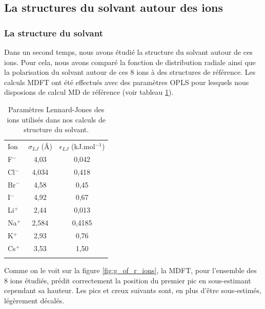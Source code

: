 \subsection{La structures du solvant autour des ions}

\subsubsection{La structure du solvant}
Dans un second temps, nous avons étudié la structure du solvant autour de ces ions. Pour cela, nous avons comparé la fonction de distribution radiale ainsi que la polarisation du solvant autour de ces 8 ions à des structures de référence.
Les calculs MDFT ont été effectués avec des paramètres OPLS\cite{jorgensen_development_1996} pour lesquels nous disposions de calcul MD de référence\cite{zhao_molecular_2011} (voir tableau \ref{tab:param_lj_ions_daniel}).

\begin{table}[ht]
  \centering
  \begin{tabular}{l c c}
   \hline & \\[-1em]\hline
    Ion    & $\sigma_{LJ}$ (\AA) & $\epsilon_{LJ}$ (kJ.mol$^{-1}$) \\
    \hline
      F$^-$	 & 4,03 & 0,042 \\
      Cl$^-$ & 4,034 & 0,418 \\
      Br$^-$ & 4,58 & 0,45 \\
      I$^-$  & 4,92 & 0,67 \\
      Li$^+$ & 2,44 & 0,013 \\
      Na$^+$ & 2,584 & 0,4185 \\
      K$^+$  & 2,93 & 0,76 \\
      Cs$^+$ & 3,53 & 1,50 \\
    \hline & \\[-1em]\hline
  \end{tabular}
  \caption{Paramètres Lennard-Jones des ions utilisés dans nos calculs de structure du solvant.}
  \label{tab:param_lj_ions_daniel}  
\end{table}


Comme on le voit sur la figure \ref{fig:g_of_r_ions}, la MDFT, pour l'ensemble des 8 ions étudiés, prédit correctement la position du premier pic en sous-estimant cependant sa hauteur. Les pics et creux suivants sont, en plus d'être sous-estimés, légèrement décalés.


